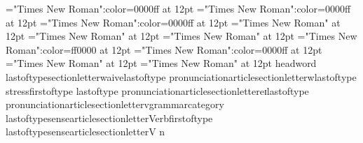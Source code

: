 \font\examplesensearticlesectionletter="Times New Roman":color=0000ff at 12pt
\font\exampleusefirstoftypelastoftypesensearticlesectionletter="Times New Roman":color=0000ff at 12pt
\font\firstoftypegrammarcategorylastoftypesensearticlesectionletter="Times New Roman":color=0000ff at 12pt
\font\firstoftypelastoftypestressfirstoftypelastoftypepronunciationarticlesectionletter="Times New Roman" at 12pt
\font\firstoftypelastoftypepronunciationarticlesectionletter="Times New Roman" at 12pt
\font\firstoftypeheadwordlastoftypesectionletter="Times New Roman" at 12pt
\font\sensebeforearticlesectionletter="Times New Roman":color=ff0000 at 12pt
\font\sensearticlesectionletter="Times New Roman":color=0000ff at 12pt
\font\articlesectionletter="Times New Roman" at 12pt
\font\sectionletter="Times New Roman" at 12pt
\firstoftype headword lastoftypesectionletter{waive}\firstoftype lastoftype pronunciationarticlesectionletter{w}\firstoftype lastoftype stressfirstoftype lastoftype pronunciationarticlesectionletter{eɪ}\firstoftype lastoftype pronunciationarticlesectionletter{v}\firstoftype grammarcategory lastoftypesensearticlesectionletter{Verb}\exampleuse firstoftype lastoftypesensearticlesectionletter{V n}

\bye
